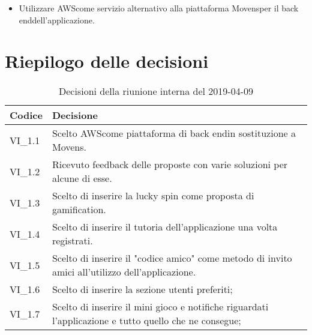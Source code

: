 \begin{itemize}
\begin{itemize}
			\item progress bar;
			\item punti esperienza/gettoni accumulati in base a quanto viene utilizzata l'applicazione;
			\item rewards giornalieri;
			\item recensioni agli utenti;
			\item easter egg;
			\item mileston unlock\glosp che sono semplici obbiettivi da completare all'interno dell'applicazione che fruttano premi;
		\end{itemize}
	\item Utilizzare AWS\glosp come servizio alternativo alla piattaforma Movens\glosp per il back end\glosp dell'applicazione.
\end{itemize} 
\pagebreak
\section{Riepilogo delle decisioni}

	
	\begin{longtable}{ >{\centering}p{} >{}p{}}
		\caption{Decisioni della riunione interna del 2019-04-09}\\	
		\rowcolorhead
		\textbf{\color{white}Codice} 
		& \centering\textbf{\color{white}Decisione} 
		\tabularnewline 
		\endfirsthead
		VI\_1.1 & Scelto AWS\glosp come piattaforma di back end\glosp in sostituzione a Movens\glo.
		
		\tabularnewline 
		VI\_1.2 & Ricevuto feedback delle proposte con varie soluzioni per alcune di esse.
		
		\tabularnewline 
		VI\_1.3 & Scelto di inserire la lucky spin come proposta di gamification\glo.
	
		\tabularnewline 
		VI\_1.4 & Scelto di inserire il tutoria dell'applicazione una volta registrati.
		
		\tabularnewline 
		VI\_1.5 & Scelto di inserire il "codice amico" come metodo di invito amici all'utilizzo dell'applicazione.
		
		\tabularnewline 
		VI\_1.6 & Scelto di inserire la sezione utenti preferiti;
		
		\tabularnewline 
		VI\_1.7 & Scelto di inserire il mini gioco e notifiche riguardati l'applicazione e tutto quello che ne consegue;
	\end{longtable}
	




